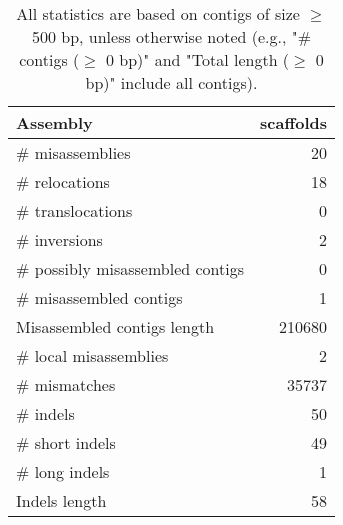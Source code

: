 \documentclass[12pt,a4paper]{article}
\begin{document}
\begin{table}[ht]
\begin{center}
\caption{All statistics are based on contigs of size $\geq$ 500 bp, unless otherwise noted (e.g., "\# contigs ($\geq$ 0 bp)" and "Total length ($\geq$ 0 bp)" include all contigs).}
\begin{tabular}{|l*{1}{|r}|}
\hline
Assembly & scaffolds \\ \hline
\# misassemblies & 20 \\ \hline
\hspace{5mm}\# relocations & 18 \\ \hline
\hspace{5mm}\# translocations & 0 \\ \hline
\hspace{5mm}\# inversions & 2 \\ \hline
\# possibly misassembled contigs & 0 \\ \hline
\# misassembled contigs & 1 \\ \hline
Misassembled contigs length & 210680 \\ \hline
\# local misassemblies & 2 \\ \hline
\# mismatches & 35737 \\ \hline
\# indels & 50 \\ \hline
\hspace{5mm}\# short indels & 49 \\ \hline
\hspace{5mm}\# long indels & 1 \\ \hline
Indels length & 58 \\ \hline
\end{tabular}
\end{center}
\end{table}
\end{document}
